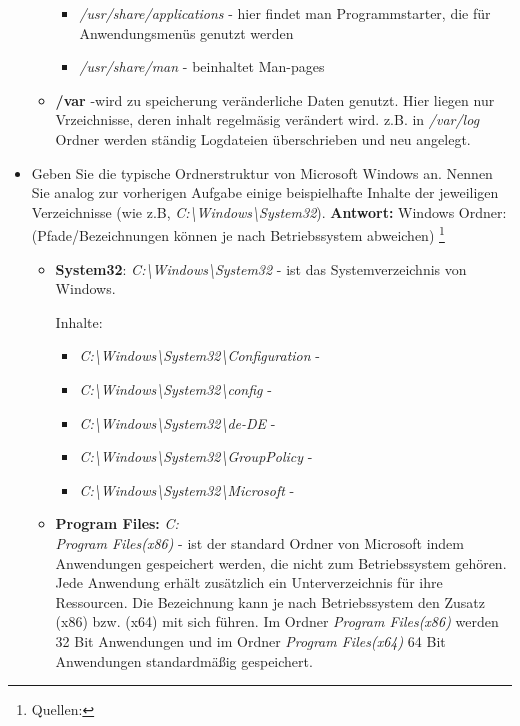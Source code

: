 \begin{itemize}
\begin{itemize}
\begin{itemize}
				\item \textit{/usr/share/applications} - hier findet man Programmstarter, die für Anwendungsmenüs genutzt werden
				\item \textit{/usr/share/man} - beinhaltet Man-pages
			\end{itemize}
			\item \textbf{/var } -wird zu speicherung veränderliche Daten genutzt. Hier liegen nur Vrzeichnisse,
			deren inhalt regelmäsig verändert wird.
			z.B. in \textit{/var/log} Ordner werden ständig Logdateien überschrieben und neu angelegt.


		\end{itemize}
\item Geben Sie die typische Ordnerstruktur von Microsoft Windows an. Nennen Sie analog
zur vorherigen Aufgabe einige beispielhafte Inhalte der jeweiligen Verzeichnisse (wie z.B,
\textit{C:\textbackslash Windows\textbackslash System32}).
\textbf{Antwort:} Windows Ordner: (Pfade/Bezeichnungen können je nach Betriebssystem abweichen)
\footnote{Quellen:}
\begin{itemize}
	\item \textbf{System32}:	\textit{C:\textbackslash Windows\textbackslash System32} - ist das Systemverzeichnis von Windows.

	Inhalte:
	\begin{itemize}
		\item \textit{C:\textbackslash Windows\textbackslash System32\textbackslash Configuration} -
		\item \textit{C:\textbackslash Windows\textbackslash System32\textbackslash config} -
		\item \textit{C:\textbackslash Windows\textbackslash System32\textbackslash de-DE} -
		\item \textit{C:\textbackslash Windows\textbackslash System32\textbackslash GroupPolicy} -
		\item \textit{C:\textbackslash Windows\textbackslash System32\textbackslash Microsoft} -
\end{itemize}
 \item \textbf{Program Files:}	 \textit{C:\\Program Files(x86)} -
	ist der standard Ordner von Microsoft indem Anwendungen gespeichert werden, die
	nicht zum Betriebssystem gehören. Jede Anwendung erhält zusätzlich ein Unterverzeichnis für
	ihre Ressourcen. Die Bezeichnung kann je nach Betriebssystem den Zusatz (x86) bzw. (x64) mit
	sich führen. Im Ordner \textit{Program Files(x86)} werden 32 Bit Anwendungen und im Ordner
	\textit{Program Files(x64)} 64 Bit Anwendungen standardmäßig gespeichert.


\end{itemize}
\end{itemize}

